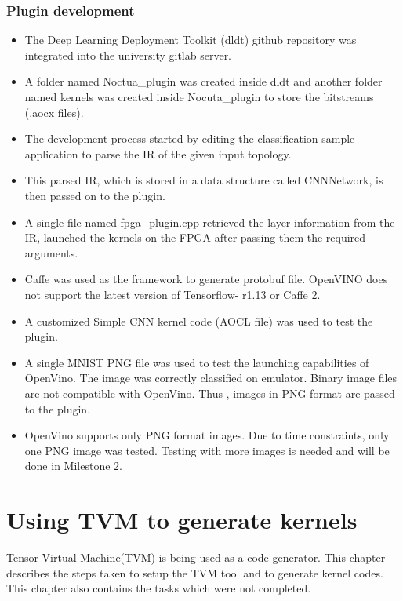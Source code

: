 \documentclass[titlepage]{report}
\begin{document}
\subsection{Plugin development}
\begin{itemize}
\item The Deep Learning Deployment Toolkit (dldt) github repository was integrated into the university gitlab server. 
\item A folder named Noctua\_plugin was created inside dldt and another folder named kernels was created inside Nocuta\_plugin to store the bitstreams (.aocx files).
\item The development process started by editing the classification sample application to parse the IR of the given input topology. 
\item This parsed IR, which is stored in a data structure called CNNNetwork, is then passed on to the plugin. 
\item A single file named fpga\_plugin.cpp retrieved the layer information from the IR, launched the kernels on the FPGA after passing them the required arguments.
\item Caffe was used as the framework to generate protobuf file. OpenVINO does not support the latest version of Tensorflow- r1.13 or Caffe 2.
\item A customized Simple CNN kernel code (AOCL file) was used to test the plugin.
\item A single MNIST PNG file was used to test the launching capabilities of OpenVino. The image was correctly classified on emulator. Binary image files are not compatible with OpenVino. Thus , images in PNG format are passed to the plugin.
\item OpenVino supports only PNG format images. Due to time constraints, only one PNG image was tested. Testing with more images is needed and will be done in Milestone 2.
 
\end{itemize} 





\chapter{Using TVM to generate kernels}
Tensor Virtual Machine(TVM) is being used as a code generator. This chapter describes the steps taken to setup the TVM tool and to generate kernel codes. This chapter also contains the tasks which were not completed.
\end{document}
